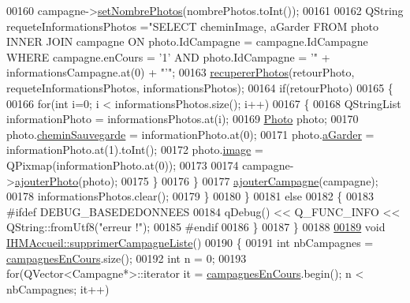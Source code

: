\begin{DoxyCode}
{00160             campagne->\hyperlink{class_campagne_a2b8848ade0f97708571331ef71e4c9cb}{setNombrePhotos}(nombrePhotos.toInt());
00161 
00162             QString requeteInformationsPhotos =\textcolor{stringliteral}{"SELECT cheminImage, aGarder FROM photo INNER JOIN campagne
       ON photo.IdCampagne = campagne.IdCampagne WHERE campagne.enCours = '1' AND photo.IdCampagne = '"} + 
      informationsCampagne.at(0) + \textcolor{stringliteral}{"'"};
00163             \hyperlink{class_i_h_m_accueil_aebeef48b9bc345edd02e5185951c454e}{recupererPhotos}(retourPhoto, requeteInformationsPhotos, informationsPhotos);
00164             \textcolor{keywordflow}{if}(retourPhoto)
00165             \{
00166                 \textcolor{keywordflow}{for}(\textcolor{keywordtype}{int} i=0; i < informationsPhotos.size(); i++)
00167                 \{
00168                     QStringList informationPhoto = informationsPhotos.at(i);
00169                     \hyperlink{struct_photo}{Photo} photo;
00170                     photo.\hyperlink{struct_photo_a3c28eb9ad160b65deb46a72146a1d14f}{cheminSauvegarde} = informationPhoto.at(0);
00171                     photo.\hyperlink{struct_photo_afec1baefdd7d036432494bbb33b21366}{aGarder} = informationPhoto.at(1).toInt();
00172                     photo.\hyperlink{struct_photo_aa6ecfed8082bea5af2905208308a6adb}{image} = QPixmap(informationPhoto.at(0));
00173 
00174                     campagne->\hyperlink{class_campagne_a472029bf46646d136a750dbaa7a3155f}{ajouterPhoto}(photo);
00175                 \}
00176             \}
00177             \hyperlink{class_i_h_m_accueil_a3087ce7a78561c79ce3148761750dd1d}{ajouterCampagne}(campagne);
00178             informationsPhotos.clear();
00179         \}
00180      \}
00181      \textcolor{keywordflow}{else}
00182      \{
00183 \textcolor{preprocessor}{        #ifdef DEBUG\_BASEDEDONNEES}
00184         qDebug() << Q\_FUNC\_INFO << QString::fromUtf8(\textcolor{stringliteral}{"erreur !"});
00185 \textcolor{preprocessor}{        #endif}
00186      \}
00187 \}
00188 
\hyperlink{class_i_h_m_accueil_a36ce6ecca4e258562577bab1439e0a96}{00189} \textcolor{keywordtype}{void} \hyperlink{class_i_h_m_accueil_a36ce6ecca4e258562577bab1439e0a96}{IHMAccueil::supprimerCampagneListe}()
00190 \{
00191     \textcolor{keywordtype}{int} nbCampagnes = \hyperlink{class_i_h_m_accueil_ad3827b81480eb201b5927c16a2ad1c46}{campagnesEnCours}.size();
00192     \textcolor{keywordtype}{int} n = 0;
00193     \textcolor{keywordflow}{for}(QVector<Campagne*>::iterator it = \hyperlink{class_i_h_m_accueil_ad3827b81480eb201b5927c16a2ad1c46}{campagnesEnCours}.begin(); n < nbCampagnes; it++)
}
\end{DoxyCode}
